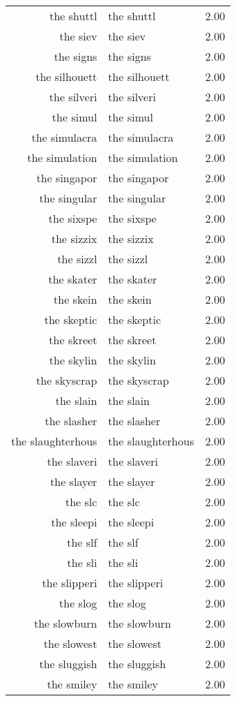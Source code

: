 \begin{table}[ht]
\begin{tabular}{rlr}
  the shuttl & the shuttl & 2.00 \\ 
  the siev & the siev & 2.00 \\ 
  the signs & the signs & 2.00 \\ 
  the silhouett & the silhouett & 2.00 \\ 
  the silveri & the silveri & 2.00 \\ 
  the simul & the simul & 2.00 \\ 
  the simulacra & the simulacra & 2.00 \\ 
  the simulation & the simulation & 2.00 \\ 
  the singapor & the singapor & 2.00 \\ 
  the singular & the singular & 2.00 \\ 
  the sixspe & the sixspe & 2.00 \\ 
  the sizzix & the sizzix & 2.00 \\ 
  the sizzl & the sizzl & 2.00 \\ 
  the skater & the skater & 2.00 \\ 
  the skein & the skein & 2.00 \\ 
  the skeptic & the skeptic & 2.00 \\ 
  the skreet & the skreet & 2.00 \\ 
  the skylin & the skylin & 2.00 \\ 
  the skyscrap & the skyscrap & 2.00 \\ 
  the slain & the slain & 2.00 \\ 
  the slasher & the slasher & 2.00 \\ 
  the slaughterhous & the slaughterhous & 2.00 \\ 
  the slaveri & the slaveri & 2.00 \\ 
  the slayer & the slayer & 2.00 \\ 
  the slc & the slc & 2.00 \\ 
  the sleepi & the sleepi & 2.00 \\ 
  the slf & the slf & 2.00 \\ 
  the sli & the sli & 2.00 \\ 
  the slipperi & the slipperi & 2.00 \\ 
  the slog & the slog & 2.00 \\ 
  the slowburn & the slowburn & 2.00 \\ 
  the slowest & the slowest & 2.00 \\ 
  the sluggish & the sluggish & 2.00 \\ 
  the smiley & the smiley & 2.00 \\ 

\end{tabular}
\end{table}
